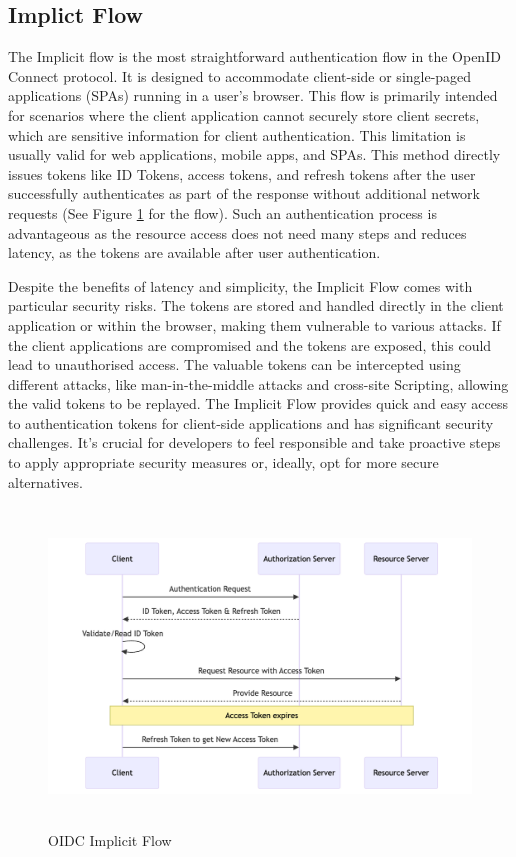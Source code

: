 \subsection{Implict Flow}
The Implicit flow is the most straightforward authentication flow in the OpenID Connect protocol. It is designed to accommodate client-side or single-paged applications (SPAs) running in a user's browser. This flow is primarily intended for scenarios where the client application cannot securely store client secrets, which are sensitive information for client authentication. This limitation is usually valid for web applications, mobile apps, and SPAs. This method directly issues tokens like ID Tokens, access tokens, and refresh tokens after the user successfully authenticates as part of the response without additional network requests (See Figure \ref{fig:implicit_flow} for the flow). Such an authentication process is advantageous as the resource access does not need many steps and reduces latency, as the tokens are available after user authentication. 

Despite the benefits of latency and simplicity, the Implicit Flow comes with particular security risks. The tokens are stored and handled directly in the client application or within the browser, making them vulnerable to various attacks. If the client applications are compromised and the tokens are exposed, this could lead to unauthorised access. The valuable tokens can be intercepted using different attacks, like man-in-the-middle attacks and cross-site Scripting, allowing the valid tokens to be replayed. The Implicit Flow provides quick and easy access to authentication tokens for client-side applications and has significant security challenges. It's crucial for developers to feel responsible and take proactive steps to apply appropriate security measures or, ideally, opt for more secure alternatives.
\begin{figure}[h!]
\centering
\caption{OIDC Implicit Flow}\label{fig:implicit_flow}
\includegraphics[width=\textwidth, height=320px]{pics/implicit_flow.png}
\end{figure}

